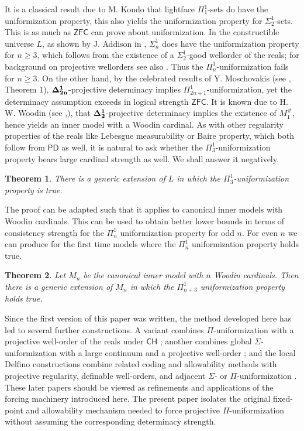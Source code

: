 \documentclass[a4paper,11pt]{article}
\newtheorem*{theorem*}{Theorem}
\newcommand{\ZFC}{\mathsf{ZFC}}
\newcommand{\CH}{\mathsf{CH}}
\newcommand{\PD}{\mathsf{PD}}
\begin{document}
It is a classical result due to M. Kondo \cite{Kondo} that lightface $\Pi^1_{1}$-sets do have the 
uniformization property, this also yields the uniformization property for $\Sigma^1_{2}$-sets. This is as much as $\ZFC$ can prove about uniformization.
In the constructible universe $L$, as shown by J. Addison in \cite{Addison}, $\Sigma^1_{n}$ does have the uniformization property for $n \ge 3$, which follows from the existence of a $\Sigma^1_{2}$-good wellorder of the reals; for background on projective wellorders see also \cite{CS,SyVera}. Thus the $\Pi^1_{n}$-uniformization fails for $n \ge 3$. On the other hand, by the celebrated results of Y. Moschovakis (see \cite{Moschovakis2}, Theorem 1), 
$\bf{\Delta}^1_{2n}$-projective determinacy implies ${\Pi}^1_{2n+1}$-uniformization, yet the determinacy assumption exceeds in logical strength $\ZFC$. It is known due to H. W. Woodin (see \cite{MSW},), that $\bf{\Delta}^1_2$-projective determinacy implies the existence of $M_1^{\#}$, hence yields an inner model with a Woodin cardinal. 
As with other regularity properties of the reals like Lebesgue measurability or Baire property, which both follow from $\PD$ as well, it is natural to ask whether the $\Pi^1_3$-uniformization property bears large cardinal strength as well. We shall answer it negatively.


\begin{theorem*}
There is a generic extension of $L$ in which the $\Pi^1_3$-uniformization property is true. 
\end{theorem*} 
The proof can be adapted such that it applies to canonical inner models with Woodin cardinals. This can be used to obtain better lower bounds in terms of consistency strength for the $\Pi^1_n$ uniformization property for odd $n$. For even $n$ we can produce for the first time models where the $\Pi^1_n$ uniformization property holds true.
\begin{theorem*}
Let $M_n$ be the canonical inner model with $n$ Woodin cardinals. Then there is a generic extension of $M_n$ in which the $\Pi^1_{n+3}$ uniformization property holds true.
\end{theorem*}

Since the first version of this paper was written, the method developed here has led to several further constructions.  A variant combines $\Pi$-uniformization with a projective well-order of the reals under $\CH$ \cite{HoffelnerPiUniformizationWellorder}; another combines global $\Sigma$-uniformization with a large continuum and a projective well-order \cite{HoffelnerLargeContinuumGlobalSigma}; and the local Delfino constructions combine related coding and allowability methods with projective regularity, definable well-orders, and adjacent $\Sigma$- or $\Pi$-uniformization \cite{HoffelnerLocalDelfinoSigma,HoffelnerLocalDelfinoPi}.  These later papers should be viewed as refinements and applications of the forcing machinery introduced here.  The present paper isolates the original fixed-point and allowability mechanism needed to force projective $\Pi$-uniformization without assuming the corresponding determinacy strength.
\end{document}
